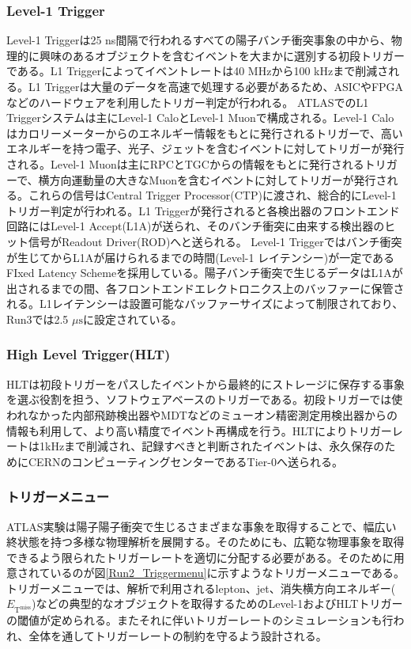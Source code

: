 \subsubsection{Level-1 Trigger}
\baselineskip
Level-1 Triggerは25 ns間隔で行われるすべての陽子バンチ衝突事象の中から、物理的に興味のあるオブジェクトを含むイベントを大まかに選別する初段トリガーである。L1 Triggerによってイベントレートは40 MHzから100 kHzまで削減される。L1 Triggerは大量のデータを高速で処理する必要があるため、ASICやFPGAなどのハードウェアを利用したトリガー判定が行われる。
ATLASでのL1 Triggerシステムは主にLevel-1 CaloとLevel-1 Muonで構成される。Level-1 Caloはカロリーメーターからのエネルギー情報をもとに発行されるトリガーで、高いエネルギーを持つ電子、光子、ジェットを含むイベントに対してトリガーが発行される。Level-1 Muonは主にRPCとTGCからの情報をもとに発行されるトリガーで、横方向運動量の大きなMuonを含むイベントに対してトリガーが発行される。これらの信号はCentral Trigger Processor(CTP)に渡され、総合的にLevel-1トリガー判定が行われる。L1 Triggerが発行されると各検出器のフロントエンド回路にはLevel-1 Accept(L1A)が送られ、そのバンチ衝突に由来する検出器のヒット信号がReadout Driver(ROD)へと送られる。
Level-1 Triggerではバンチ衝突が生じてからL1Aが届けられるまでの時間(Level-1 レイテンシー)が一定であるFIxed Latency Schemeを採用している。陽子バンチ衝突で生じるデータはL1Aが出されるまでの間、各フロントエンドエレクトロニクス上のバッファーに保管される。L1レイテンシーは設置可能なバッファーサイズによって制限されており、Run3では2.5 $\mu\mathrm{s}$に設定されている。

\subsubsection*{High Level Trigger(HLT)}
\baselineskip
HLTは初段トリガーをパスしたイベントから最終的にストレージに保存する事象を選ぶ役割を担う、ソフトウェアベースのトリガーである。初段トリガーでは使われなかった内部飛跡検出器やMDTなどのミューオン精密測定用検出器からの情報も利用して、より高い精度でイベント再構成を行う。HLTによりトリガーレートは1kHzまで削減され、記録すべきと判断されたイベントは、永久保存のためにCERNのコンピューティングセンターであるTier-0へ送られる。

\subsubsection*{トリガーメニュー}
ATLAS実験は陽子陽子衝突で生じるさまざまな事象を取得することで、幅広い終状態を持つ多様な物理解析を展開する。そのためにも、広範な物理事象を取得できるよう限られたトリガーレートを適切に分配する必要がある。そのために用意されているのが図\ref{Run2_Triggermenu}に示すようなトリガーメニューである。トリガーメニューでは、解析で利用されるlepton、jet、消失横方向エネルギー($E_{\mathrm{T}^{\mathrm{miss}}}$)などの典型的なオブジェクトを取得するためのLevel-1およびHLTトリガーの閾値が定められる。またそれに伴いトリガーレートのシミュレーションも行われ、全体を通してトリガーレートの制約を守るよう設計される。

